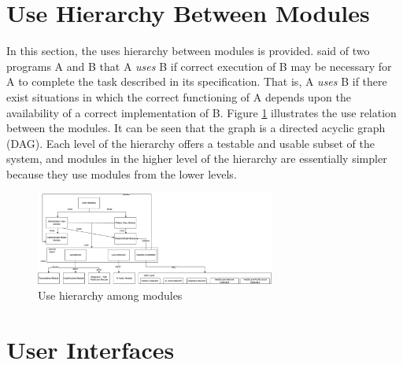 \documentclass[12pt, titlepage]{article}
\begin{document}
\section{Use Hierarchy Between Modules} \label{SecUse}

In this section, the uses hierarchy between modules is
provided. \citet{Parnas1978} said of two programs A and B that A {\em uses} B if
correct execution of B may be necessary for A to complete the task described in
its specification. That is, A {\em uses} B if there exist situations in which
the correct functioning of A depends upon the availability of a correct
implementation of B.  Figure \ref{FigUH} illustrates the use relation between
the modules. It can be seen that the graph is a directed acyclic graph
(DAG). Each level of the hierarchy offers a testable and usable subset of the
system, and modules in the higher level of the hierarchy are essentially simpler
because they use modules from the lower levels.



\begin{figure}[H]
\centering
\includegraphics[width=0.7\textwidth]{user-hierarchy.png}
\caption{Use hierarchy among modules}
\label{FigUH}
\end{figure}


\section{User Interfaces} \label{sec:UserInterfaces}
\end{document}
